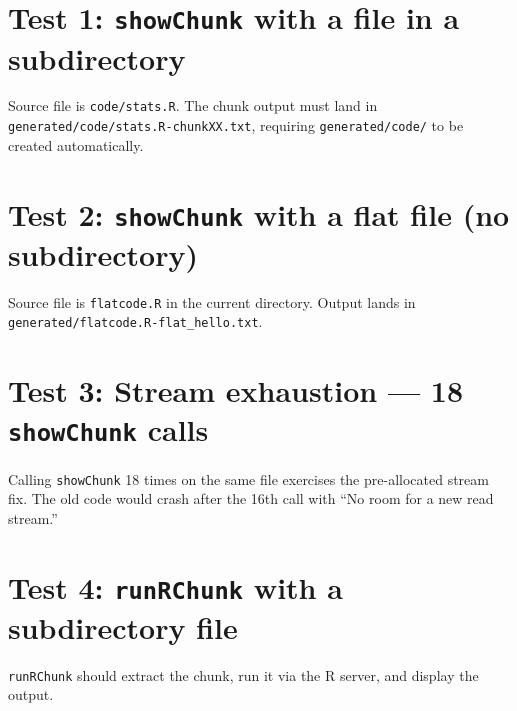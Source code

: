 \documentclass[12pt]{article}
\begin{document}
\section*{Test 1: \texttt{showChunk} with a file in a subdirectory}

Source file is \texttt{code/stats.R}.
The chunk output must land in \texttt{generated/code/stats.R-chunkXX.txt},
requiring \texttt{generated/code/} to be created automatically.


\section*{Test 2: \texttt{showChunk} with a flat file (no subdirectory)}

Source file is \texttt{flatcode.R} in the current directory.
Output lands in \texttt{generated/flatcode.R-flat\_hello.txt}.


\section*{Test 3: Stream exhaustion — 18 \texttt{showChunk} calls}

Calling \texttt{showChunk} 18 times on the same file exercises the
pre-allocated stream fix. The old code would crash after the 16th call
with ``No room for a new read stream.''


\section*{Test 4: \texttt{runRChunk} with a subdirectory file}

\texttt{runRChunk} should extract the chunk, run it via the R server,
and display the output.
\end{document}

